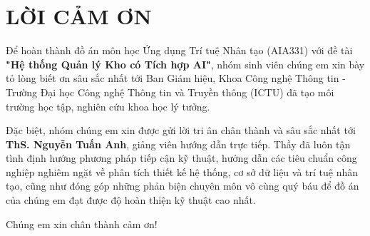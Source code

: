 \chapter*{LỜI CẢM ƠN}

Để hoàn thành đồ án môn học Ứng dụng Trí tuệ Nhân tạo (AIA331) với đề tài \textbf{"Hệ thống Quản lý Kho có Tích hợp AI"}, nhóm sinh viên chúng em xin bày tỏ lòng biết ơn sâu sắc nhất tới Ban Giám hiệu, Khoa Công nghệ Thông tin - Trường Đại học Công nghệ Thông tin và Truyền thông (ICTU) đã tạo môi trường học tập, nghiên cứu khoa học lý tưởng.

Đặc biệt, nhóm chúng em xin được gửi lời tri ân chân thành và sâu sắc nhất tới \textbf{ThS. Nguyễn Tuấn Anh}, giảng viên hướng dẫn trực tiếp. Thầy đã luôn tận tình định hướng phương pháp tiếp cận kỹ thuật, hướng dẫn các tiêu chuẩn công nghiệp nghiêm ngặt về phân tích thiết kế hệ thống, cơ sở dữ liệu và trí tuệ nhân tạo, cũng như đóng góp những phản biện chuyên môn vô cùng quý báu để đồ án của chúng em đạt được độ hoàn thiện kỹ thuật cao nhất.

Chúng em xin chân thành cảm ơn!
